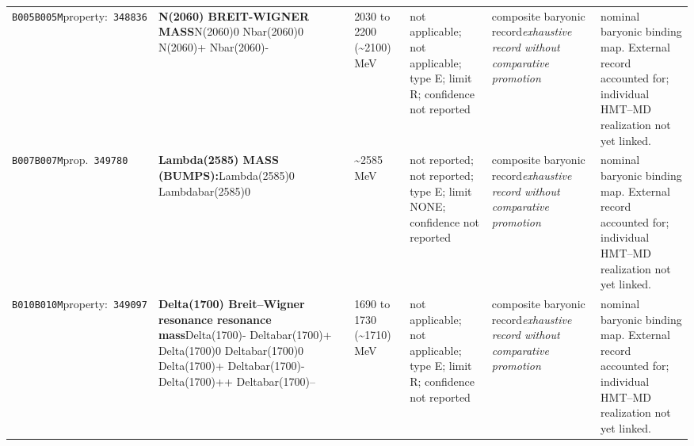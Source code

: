 \begin{landscape}
\begin{longtable}{L{1.85cm}L{4.45cm}L{2.35cm}L{4.05cm}L{3.35cm}L{7.15cm}}
\texttt{B005}\newline \texttt{B005M}\newline property:\ \texttt{348836} & \textbf{N(2060) BREIT-WIGNER MASS}\newline N(2060)0 \textbar{}\allowbreak{} Nbar(2060)0 \textbar{}\allowbreak{} N(2060)+ \textbar{}\allowbreak{} Nbar(2060)- & 2030 to 2200 (\textasciitilde{}2100)\,MeV & not applicable; not applicable; type E; limit R; confidence not reported & composite baryonic record\newline \emph{exhaustive record without comparative promotion} & nominal baryonic binding map. External record accounted for; individual HMT--MD realization not yet linked. \\
\texttt{B007}\newline \texttt{B007M}\newline prop.\ \texttt{349780} & \textbf{Lambda(2585) MASS (BUMPS):}\newline Lambda(2585)0 \textbar{}\allowbreak{} Lambdabar(2585)0 & \textasciitilde{}2585\,MeV & not reported; not reported; type E; limit NONE; confidence not reported & composite baryonic record\newline \emph{exhaustive record without comparative promotion} & nominal baryonic binding map. External record accounted for; individual HMT--MD realization not yet linked. \\
\texttt{B010}\newline \texttt{B010M}\newline property:\ \texttt{349097} & \textbf{Delta(1700) Breit--Wigner resonance resonance mass}\newline Delta(1700)- \textbar{}\allowbreak{} Deltabar(1700)+ \textbar{}\allowbreak{} Delta(1700)0 \textbar{}\allowbreak{} Deltabar(1700)0 \textbar{}\allowbreak{} Delta(1700)+ \textbar{}\allowbreak{} Deltabar(1700)- \textbar{}\allowbreak{} Delta(1700)++ \textbar{}\allowbreak{} Deltabar(1700)-- & 1690 to 1730 (\textasciitilde{}1710)\,MeV & not applicable; not applicable; type E; limit R; confidence not reported & composite baryonic record\newline \emph{exhaustive record without comparative promotion} & nominal baryonic binding map. External record accounted for; individual HMT--MD realization not yet linked. \\

\end{longtable}
\end{landscape}
